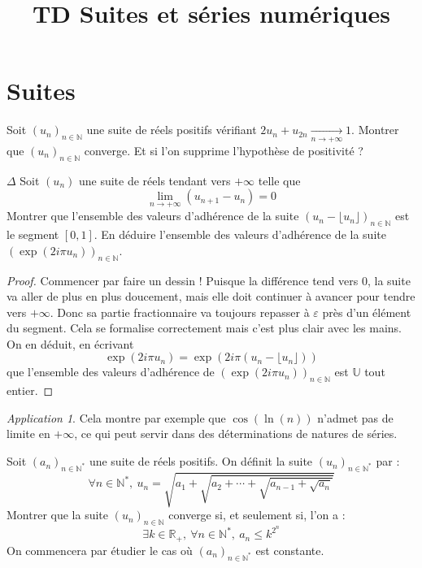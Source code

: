 \documentclass[french,a4paper]{article}
\title{TD Suites et séries numériques}
\newcommand{\N}{\mathbb{N}}
\newcommand{\R}{\mathbb{R}}
\newcommand{\U}{\mathbb{U}}
\newcommand{\st}{^*}
\theoremstyle{plain}
\theoremstyle{definition}
\theoremstyle{remark}
\newtheorem*{app}{Application}
\begin{document}
\maketitle

\section{Suites}

\begin{ex}[Moulin.01]{}
	Soit $(u_n)_{n\in\N}$ une suite de réels positifs vérifiant $2u_n+u_{2n}\xrightarrow[n\to+\infty]{}1$. Montrer que $(u_n)_{n\in\N}$ converge. Et si l'on supprime l'hypothèse de positivité ?
\end{ex}

\begin{ex}[Moulin.02]{$\Delta$}
	Soit $(u_n)$ une suite de réels tendant vers $+\infty$ telle que $$\lim_{n\to+\infty}(u_{n+1}-u_n)=0$$ Montrer que l'ensemble des valeurs d'adhérence de la suite $(u_n-\lfloor u_n\rfloor)_{n\in\N}$ est le segment $[0,1]$. En déduire l'ensemble des valeurs d'adhérence de la suite $\left(\exp(2i\pi u_n)\right)_{n\in\N}$.
\end{ex}

\begin{proof}
	Commencer par faire un dessin ! Puisque la différence tend vers $0$, la suite va aller de plus en plus doucement, mais elle doit continuer à avancer pour tendre vers $+\infty$. Donc sa partie fractionnaire va toujours repasser à $\varepsilon$ près d'un élément du segment. Cela se formalise correctement mais c'est plus clair avec les mains. On en déduit, en écrivant $$\exp(2i\pi u_n)=\exp(2i\pi (u_n-\lfloor u_n\rfloor))$$ que l'ensemble des valeurs d'adhérence de $\left(\exp(2i\pi u_n)\right)_{n\in\N}$ est $\U$ tout entier.
\end{proof}

\begin{app}
	Cela montre par exemple que $\cos(\ln(n))$ n'admet pas de limite en $+\infty$, ce qui peut servir dans des déterminations de natures de séries.
\end{app}

\begin{ex}[Moulin.03]{}
	Soit $(a_n)_{n\in\N\st}$ une suite de réels positifs. On définit la suite $(u_n)_{n\in\N\st}$ par : $$\forall n\in\N\st,\ u_n=\displaystyle\sqrt{a_1+\sqrt{a_2+\cdots+\sqrt{a_{n-1}+\sqrt{a_n}}}}$$ Montrer que la suite $(u_n)_{n\in\N}$ converge si, et seulement si, l'on a : $$\exists k\in\R_+,\ \forall n\in\N\st,\ a_n\leqslant k^{2^n}$$ On commencera par étudier le cas où $(a_n)_{n\in\N\st}$ est constante.
\end{ex}
\end{document}
